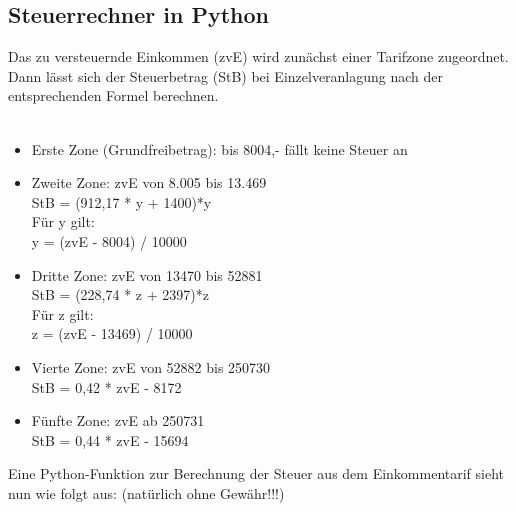 \subsection{Steuerrechner in Python}
Das zu versteuernde Einkommen (zvE) wird zunächst einer Tarifzone zugeordnet. Dann lässt sich der Steuerbetrag (StB) bei Einzelveranlagung nach der entsprechenden Formel berechnen.\\
\\
\begin{itemize}
\item Erste Zone (Grundfreibetrag): bis 8004,- \EUR{} fällt keine Steuer an 
\item Zweite Zone: zvE von 8.005 \EUR{} bis 13.469 \EUR{} \\
StB = (912,17 * y + 1400)*y \\
Für y gilt: \\
y = (zvE - 8004) / 10000 
\item Dritte Zone: zvE von 13470 \EUR{} bis 52881 \EUR{} \\
StB = (228,74 * z + 2397)*z \\
Für z gilt: \\
z = (zvE - 13469) / 10000
\item Vierte Zone: zvE von 52882 \EUR{} bis 250730 \EUR{} \\
StB = 0,42 * zvE - 8172 
\item Fünfte Zone: zvE ab 250731 \EUR{} \\
StB = 0,44 * zvE - 15694 
\end{itemize}
Eine Python-Funktion zur Berechnung der Steuer aus dem Einkommentarif sieht nun wie folgt aus: (natürlich ohne Gewähr!!!) \\
\\
